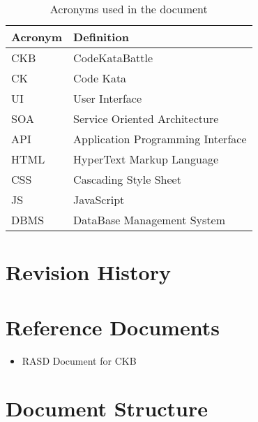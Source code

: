 \begin{table}[H]
    \begin{center}
        \begin{tabular}{|l|l|}
            \hline
            \textbf{Acronym} & \textbf{Definition}\\
            \hline
            CKB & CodeKataBattle\\
            \hline
            CK & Code Kata\\
            \hline
            UI & User Interface\\
            \hline
            SOA & Service Oriented Architecture \\
            \hline
            API & Application Programming Interface \\
            \hline
            HTML & HyperText Markup Language\\
            \hline
            CSS & Cascading Style Sheet\\
            \hline
            JS & JavaScript\\
            \hline
            DBMS & DataBase Management System\\
            \hline
        \end{tabular}
        \caption{Acronyms used in the document}
    \end{center}
\end{table}

\section{Revision History}

\section{Reference Documents}

\begin{itemize}
    \item RASD Document for \ac{CKB}
\end{itemize}

\section{Document Structure}


